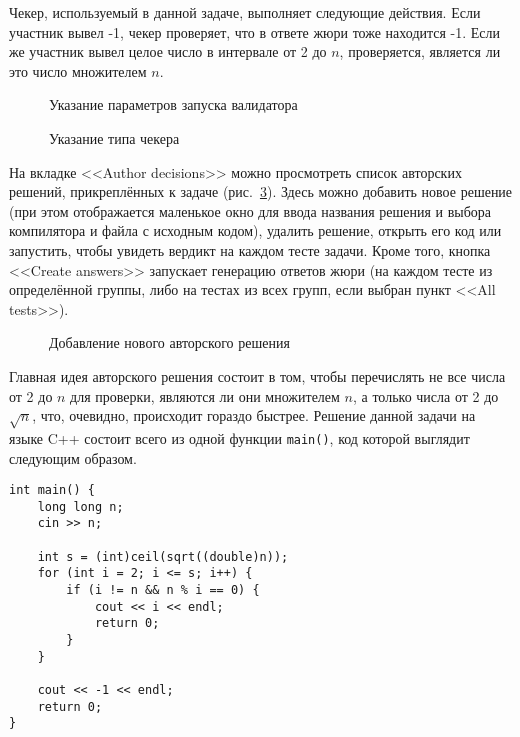 Чекер, используемый в данной задаче, выполняет следующие действия. Если участник вывел -1, чекер проверяет, что в ответе жюри тоже находится -1. Если же участник вывел целое число в интервале от 2 до $n$, проверяется, является ли это число множителем $n$.

\begin{figure}[!h]
\caption{Указание параметров запуска валидатора}
\label{screen_validators}
\end{figure}

\begin{figure}[!h]
\caption{Указание типа чекера}
\label{screen_checkers}
\end{figure}

На вкладке <<Author decisions>> можно просмотреть список авторских решений, прикреплённых к задаче (рис.~\ref{screen_author_decisions}). Здесь можно добавить новое решение (при этом отображается маленькое окно для ввода названия решения и выбора компилятора и файла с исходным кодом), удалить решение, открыть его код или запустить, чтобы увидеть вердикт на каждом тесте задачи. Кроме того, кнопка <<Create answers>> запускает генерацию ответов жюри (на каждом тесте из определённой группы, либо на тестах из всех групп, если выбран пункт <<All tests>>).

\begin{figure}[!h]
\caption{Добавление нового авторского решения}
\label{screen_author_decisions}
\end{figure}

Главная идея авторского решения состоит в том, чтобы перечислять не все числа от 2 до $n$ для проверки, являются ли они множителем $n$, а только числа от 2 до $\sqrt{n}$, что, очевидно, происходит гораздо быстрее. Решение данной задачи на языке C++ состоит всего из одной функции \texttt{main()}, код которой выглядит следующим образом.

{\small
\begin{verbatim}
int main() {
    long long n;
    cin >> n;

    int s = (int)ceil(sqrt((double)n));
    for (int i = 2; i <= s; i++) {
        if (i != n && n % i == 0) {
            cout << i << endl;
            return 0;
        }
    }

    cout << -1 << endl;
    return 0;
}
\end{verbatim}
}